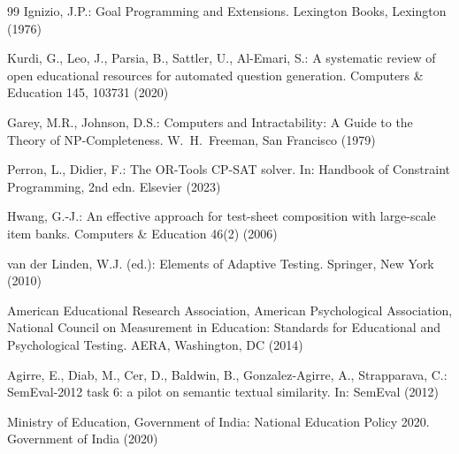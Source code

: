 \documentclass[runningheads]{llncs}
\begin{document}
\begin{thebibliography}{99}
Ignizio, J.P.: Goal Programming and Extensions. Lexington Books, Lexington (1976)

Kurdi, G., Leo, J., Parsia, B., Sattler, U., Al-Emari, S.: A systematic review of open educational resources for automated question generation.
Computers \& Education 145, 103731 (2020)

Garey, M.R., Johnson, D.S.: Computers and Intractability: A Guide to the Theory of NP-Completeness.
W.\ H.\ Freeman, San Francisco (1979)

Perron, L., Didier, F.: The OR-Tools CP-SAT solver. In: Handbook of Constraint Programming, 2nd edn.
Elsevier (2023)

Hwang, G.-J.: An effective approach for test-sheet composition with large-scale item banks.
Computers \& Education 46(2) (2006)

van der Linden, W.J. (ed.): Elements of Adaptive Testing.
Springer, New York (2010)

American Educational Research Association, American Psychological Association, National Council on Measurement in Education: Standards for Educational and Psychological Testing.
AERA, Washington, DC (2014)

Agirre, E., Diab, M., Cer, D., Baldwin, B., Gonzalez-Agirre, A., Strapparava, C.: SemEval-2012 task 6: a pilot on semantic textual similarity.
In: SemEval (2012)

Ministry of Education, Government of India: National Education Policy 2020. Government of India (2020)
\end{thebibliography}
\end{document}
